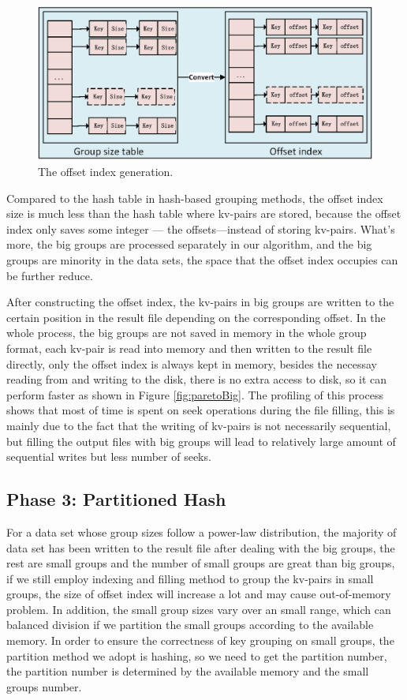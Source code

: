 \begin{figure}
\includegraphics[width=.5\textwidth]{fig/convert}
\caption{The offset index generation.}
\label{fig:convert}
\end{figure}

Compared to the hash table in hash-based grouping methods, the offset index size is much less than the hash table where kv-pairs are stored, because the offset index only saves some integer --- the offsets---instead of storing kv-pairs. What's more, the big groups are processed separately in our algorithm, and the big groups are minority in the data sets, the space that the offset index occupies can be further reduce.
 
After constructing the offset index, the kv-pairs in big groups are written to the certain position in the result file depending on the corresponding offset. In the whole process, the big groups are not saved in memory in the whole group format, each kv-pair is read into memory and then written to the result file directly, only the offset index is always kept in memory, besides the necessay reading from and writing to the disk, there is no extra access to disk, so it can perform faster as shown in Figure \ref{fig:paretoBig}. The profiling of this process shows that most of time is spent on seek operations during the file filling, this is mainly due to the fact that the writing of kv-pairs is not necessarily sequential, but filling the output files with big groups will lead to relatively large amount of sequential writes but less number of seeks.

\subsection{Phase 3: Partitioned Hash}

For a data set whose group sizes follow a power-law distribution, the majority of data set has been written to the result file after dealing with the big groups, the rest are small groups and the number of small groups are great than big groups, if we still employ indexing and filling method to group the kv-pairs in small groups, the size of offset index will increase a lot and may cause out-of-memory problem. In addition, the small group sizes vary over an small range, which can balanced division if we partition the small groups according to the available memory. In order to ensure the correctness of key grouping on small groups, the partition method we adopt is hashing, so we need to get the partition number, the partition number is determined by the available memory and the small groups number. 

